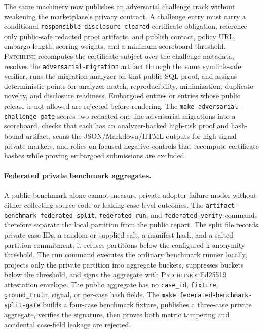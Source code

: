 \documentclass[11pt]{article}
\newcommand{\tool}{\textsc{Patchline}}
\newcommand{\code}[1]{\texttt{#1}}
\newcommand{\gate}[1]{\texttt{make #1}}
\begin{document}
The same machinery now publishes an adversarial challenge track without weakening the marketplace's
privacy contract. A challenge entry must carry a conditional
\code{responsible-disclosure-cleared} certificate obligation, reference only public-safe redacted proof
artifacts, and publish contact, policy URL, embargo length, scoring weights, and a minimum scoreboard
threshold. \tool{} recomputes the certificate subject over the challenge metadata, resolves the
\code{adversarial-migration} artifact through the same symlink-safe verifier, runs the migration analyzer
on that public SQL proof, and assigns deterministic points for analyzer match, reproducibility,
minimization, duplicate novelty, and disclosure readiness. Embargoed entries or entries whose public
release is not allowed are rejected before rendering. The \gate{adversarial-challenge-gate} scores two
redacted one-line adversarial migrations into a scoreboard, checks that each has an analyzer-backed
high-risk proof and hash-bound artifact, scans the JSON/Markdown/HTML outputs for high-signal private
markers, and relies on focused negative controls that recompute certificate hashes while proving
embargoed submissions are excluded.

\paragraph{Federated private benchmark aggregates.} A public benchmark alone cannot measure private
adopter failure modes without either collecting source code or leaking case-level outcomes. The
\code{artifact-benchmark federated-split}, \code{federated-run}, and \code{federated-verify} commands
therefore separate the local partition from the public report. The split file records private case IDs,
a random or supplied salt, a manifest hash, and a salted partition commitment; it refuses partitions
below the configured k-anonymity threshold. The run command executes the ordinary benchmark runner
locally, projects only the private partition into aggregate buckets, suppresses buckets below the
threshold, and signs the aggregate with \tool's Ed25519 attestation envelope. The public aggregate has
no \code{case\_id}, \code{fixture}, \code{ground\_truth}, signal, or per-case hash fields. The
\gate{federated-benchmark-split-gate} builds a four-case benchmark fixture, publishes a three-case
private aggregate, verifies the signature, then proves both metric tampering and accidental case-field
leakage are rejected.
\end{document}
